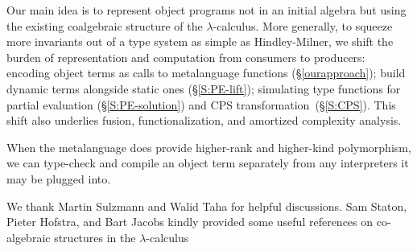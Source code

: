 \documentclass[preprint]{sigplanconf}
\begin{document}
Our main idea is to represent object programs not in an initial algebra
but using the existing coalgebraic structure of the $\lambda$-calculus.
More generally, to squeeze more invariants out of a type system as
simple as Hindley-Milner, we shift the burden of representation and
computation from consumers to producers: encoding object terms as calls
to metalanguage functions (\S\ref{ourapproach}); build dynamic terms
alongside static ones (\S\ref{S:PE-lift}); simulating type functions for
partial evaluation (\S\ref{S:PE-solution}) and CPS
transformation~(\S\ref{S:CPS}).  This shift also underlies fusion,
functionalization, and amortized complexity analysis.

When the metalanguage does provide higher-rank and higher-kind
polymorphism, we can type-check and compile an object term separately
from any interpreters it may be plugged into.

\acks%
We thank Martin Sulzmann and Walid Taha 
for helpful discussions.  Sam Staton, Pieter Hofstra, and Bart Jacobs
kindly provided some useful references on co-algebraic structures in the
$\lambda$\hyp calculus


\bibsep=0pt

\end{document}

